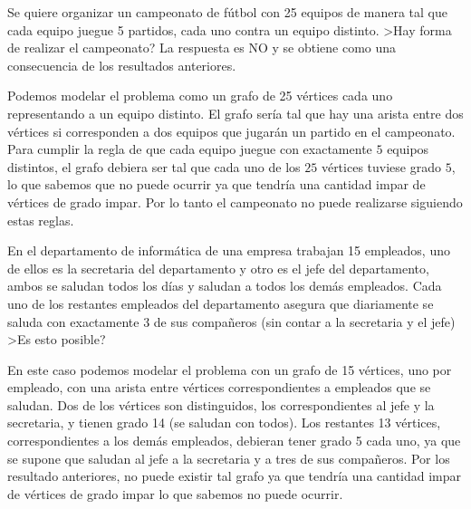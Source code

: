 \begin{ejemplo}
Se quiere organizar un campeonato de fútbol con 25 equipos de manera tal que cada equipo juegue 5 partidos, cada uno contra un equipo distinto. 
>Hay forma de realizar el campeonato?
La respuesta es NO y se obtiene como una consecuencia de los resultados anteriores.

Podemos modelar el problema como un grafo de 25 vértices cada uno representando a un equipo distinto.
El grafo sería tal que hay una arista entre dos vértices si corresponden a dos equipos que jugarán un partido en el campeonato.
Para cumplir la regla de que cada equipo juegue con exactamente $5$ equipos distintos, el grafo debiera ser tal que cada uno de los $25$ vértices tuviese grado $5$, lo que sabemos que no puede ocurrir ya que tendría una cantidad impar de vértices de grado impar.
Por lo tanto el campeonato no puede realizarse siguiendo estas reglas.
\end{ejemplo}
  
\begin{ejemplo}
En el departamento de informática de una empresa trabajan 15 empleados, uno de ellos es la secretaria del departamento y otro es el jefe del departamento, ambos se saludan todos los días y saludan a todos los demás empleados.
Cada uno de los restantes empleados del departamento asegura que diariamente se saluda con exactamente 3 de sus compañeros (sin contar a la secretaria y el jefe) 
>Es esto posible? 

En este caso podemos modelar el problema con un grafo de 15 vértices, uno por empleado, con una arista entre vértices correspondientes a empleados que se saludan.
Dos de los vértices son distinguidos, los correspondientes al jefe y la secretaria, y tienen grado 14 (se saludan con todos).
Los restantes 13 vértices, correspondientes a los demás empleados, debieran tener grado 5 cada uno, ya que se supone que saludan al jefe a la secretaria y a tres de sus compañeros.
Por los resultado anteriores, no puede existir tal grafo ya que tendría una cantidad impar de vértices de grado impar lo que sabemos no puede ocurrir.
\end{ejemplo}